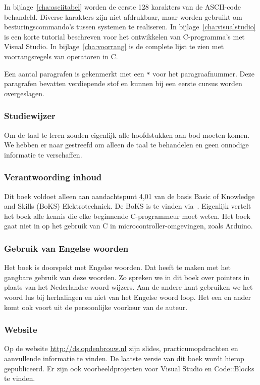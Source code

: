 In bijlage~\ref{cha:asciitabel} worden de eerste 128 karakters van de ASCII-code behandeld. Diverse karakters zijn niet afdrukbaar, maar worden gebruikt om besturingscommando's tussen systemen te realiseren. In bijlage~\ref{cha:visualstudio} is een korte tutorial beschreven voor het ontwikkelen van C-programma's met Visual Studio. In bijlage~\ref{cha:voorrang} is de complete lijst te zien met voorrangsregels van operatoren in C.

Een aantal paragrafen is gekenmerkt met een \texttt{*} voor het paragraafnummer. Deze paragrafen bevatten verdiepende stof en kunnen bij een eerste cursus worden overgeslagen.

\subsubsection*{Studiewijzer}
Om de taal te leren zouden eigenlijk alle hoofdstukken aan bod moeten komen. We hebben er naar gestreefd om alleen de taal te behandelen en geen onnodige informatie te verschaffen. 

\subsubsection*{Verantwoording inhoud}
Dit boek voldoet alleen aan aandachtspunt 4,01 van de basis Basic of Knowledge and Skills (BoKS) Elektrotechniek. De
BoKS is te vinden via~\cite{hboengineering2016boks}. Eigenlijk vertelt het boek alle kennis die elke beginnende C-programmeur moet weten. Het boek gaat niet in op het gebruik van C in microcontroller-omgevingen, zoals Arduino.

\subsubsection*{Gebruik van Engelse woorden}
Het boek is doorspekt met Engelse woorden. Dat heeft te maken met het gangbare gebruik van deze woorden. Zo spreken we in dit boek over pointers in plaats van het Nederlandse woord wijzers. Aan de andere kant gebruiken we het woord lus bij herhalingen en niet van het Engelse woord loop. Het een en ander komt ook voort uit de persoonlijke voorkeur van de auteur.

\subsubsection*{Website}
Op de website \url{http://ds.opdenbrouw.nl} zijn slides, practicumopdrachten en aanvullende informatie te vinden. De laatste versie van dit boek wordt hierop gepubliceerd. Er zijn ook voorbeeldprojecten voor Visual Studio en Code::Blocks te vinden.

